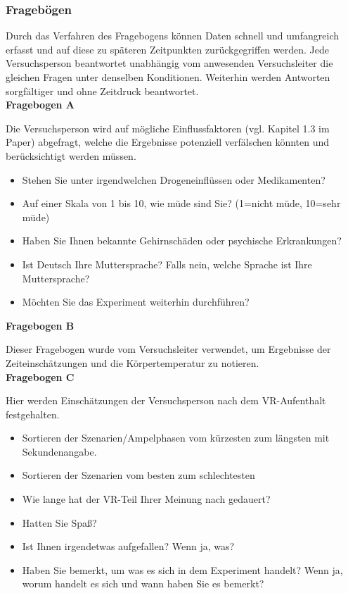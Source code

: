 \documentclass{Bericht}
\begin{document}
\subsubsection{Fragebögen}
Durch das Verfahren des Fragebogens können Daten schnell und umfangreich erfasst und auf diese zu späteren Zeitpunkten zurückgegriffen werden. Jede Versuchsperson beantwortet unabhängig vom anwesenden Versuchsleiter die gleichen Fragen unter denselben Konditionen. Weiterhin werden Antworten sorgfältiger und ohne Zeitdruck beantwortet.\\

\label{subsec:fragebogen}
\textbf{Fragebogen A}

Die Versuchsperson wird auf mögliche Einflussfaktoren (vgl. Kapitel 1.3 im Paper) abgefragt, welche die Ergebnisse potenziell verfälschen könnten und berücksichtigt werden müssen.
\begin{itemize}
	\setlength{\itemsep}{0em}
	\item Stehen Sie unter irgendwelchen Drogeneinflüssen oder Medikamenten?
	\item Auf einer Skala von 1 bis 10, wie müde sind Sie? (1=nicht müde, 10=sehr müde)
	\item Haben Sie Ihnen bekannte Gehirnschäden oder psychische Erkrankungen?
	\item Ist Deutsch Ihre Muttersprache? Falls nein, welche Sprache ist Ihre Muttersprache?
	\item Möchten Sie das Experiment weiterhin durchführen?
\end{itemize}

\textbf{Fragebogen B}

Dieser Fragebogen wurde vom Versuchsleiter verwendet, um Ergebnisse der Zeiteinschätzungen und die Körpertemperatur zu notieren.\\


\textbf{Fragebogen C}

Hier werden Einschätzungen der Versuchsperson nach dem VR-Aufenthalt festgehalten.

\begin{itemize}
	\setlength{\itemsep}{0em}
	\item Sortieren der Szenarien/Ampelphasen vom kürzesten zum längsten mit Sekundenangabe. 
	\item Sortieren der Szenarien vom besten zum schlechtesten
	\item Wie lange hat der VR-Teil Ihrer Meinung nach gedauert?
	\item Hatten Sie Spaß?
	\item Ist Ihnen irgendetwas aufgefallen? Wenn ja, was?
	\item Haben Sie bemerkt, um was es sich in dem Experiment handelt? Wenn ja, worum handelt es sich und wann haben Sie es bemerkt?
\end{itemize}
\end{document}
